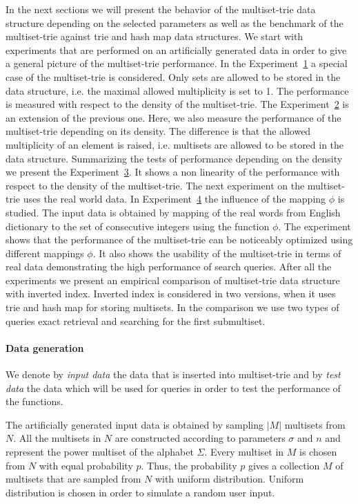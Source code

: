 In the next sections we will present the behavior of the multiset-trie data 
structure depending on the selected parameters as well as the benchmark 
of the multiset-trie against trie and hash map data structures. 
We start with experiments that are performed on an artificially generated data in 
order to give a general picture of the multiset-trie performance. In the 
Experiment~\hyperref[s:exp1]{1} a special case of the multiset-trie is considered. 
Only sets are allowed to be stored in the data structure, i.e. the maximal allowed 
multiplicity is set to 1. The performance is measured with respect to the density 
of the multiset-trie.
%
The Experiment~\hyperref[s:exp2]{2} is an extension of the previous one. Here, 
we also measure the performance of the multiset-trie depending on its density. 
The difference is that the allowed multiplicity of an element is raised, i.e. 
multisets are allowed to be stored in the data structure. 
%
Summarizing the tests of performance depending on the density we present the 
Experiment~\hyperref[s:exp3]{3}. It shows a non linearity of the performance 
with respect to the density of the multiset-trie.
%
The next experiment on the multiset-trie uses the real world data. In 
Experiment~\hyperref[s:exp4]{4} the influence of the mapping $\phi$ is studied. 
The input data is obtained by mapping of the real words from English dictionary 
to the set of consecutive integers using the function $\phi.$ The experiment 
shows that the performance of the multiset-trie can be noticeably optimized using 
different mappings $\phi.$ It also shows the usability of the multiset-trie in terms 
of real data demonstrating the high performance of search queries.
%
After all the experiments we present an empirical comparison of multiset-trie 
data structure with inverted index. Inverted index is considered in two versions, 
when it uses trie and hash map for storing multisets. In the comparison we use 
two types of queries exact retrieval and searching for the first submultiset. 

\paragraph*{Data generation}
We denote by \emph{input data} the data that is inserted into multiset-trie and 
by \emph{test data} the data which will be used for queries in order to test the 
performance of the functions.

The artificially generated input data is obtained by sampling $|M|$ multisets 
from $N.$ All the multisets in $N$ are constructed according to parameters 
$\sigma$ and $n$ and represent the power multiset of the alphabet $\Sigma.$ 
Every multiset in $M$ is chosen from $N$ with equal probability $p.$ Thus, the 
probability $p$ gives a collection $M$ of multisets that are sampled from $N$ 
with uniform distribution. Uniform distribution is chosen in order to simulate a 
random user input.

